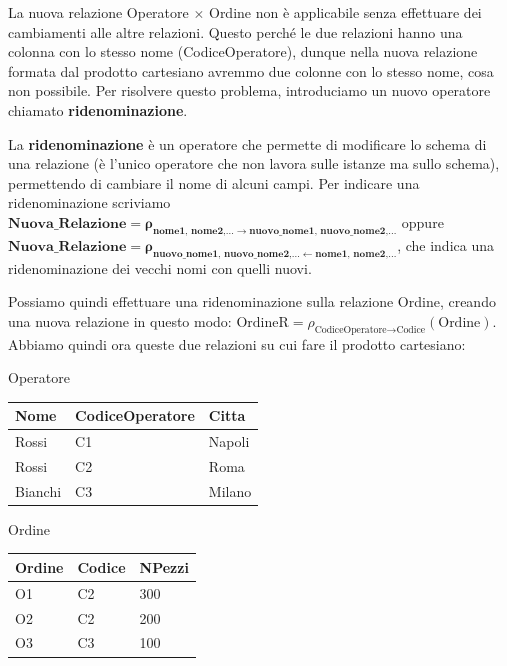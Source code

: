\documentclass[11pt, a4paper, titlepage, oneside]{scrbook}
\begin{document}
La nuova relazione Operatore $\times$ Ordine non è applicabile senza effettuare dei cambiamenti alle altre relazioni. Questo perché le due relazioni hanno una colonna con lo stesso nome (CodiceOperatore), dunque nella nuova relazione formata dal prodotto cartesiano avremmo due colonne con lo stesso nome, cosa non possibile. Per risolvere questo problema, introduciamo un nuovo operatore chiamato \textbf{ridenominazione}.

\begin{Definizione}[Ridenominazione]
\label{def-ridenominazione}
La \textbf{ridenominazione} è un operatore che permette di modificare lo schema di una relazione (è l'unico operatore che non lavora sulle istanze ma sullo schema), permettendo di cambiare il nome di alcuni campi. Per indicare una ridenominazione scriviamo $\textbf{Nuova\_Relazione} \bm{= \rho_{\textbf{nome1, nome2,}\ldots \rightarrow \textbf{nuovo\_nome1, nuovo\_nome2,}\ldots}}$ oppure $\textbf{Nuova\_Relazione} \bm{= \rho_{\textbf{nuovo\_nome1, nuovo\_nome2,}\ldots \leftarrow \textbf{nome1, nome2,}\ldots}}$, che indica una ridenominazione dei vecchi nomi con quelli nuovi.
\end{Definizione}

Possiamo quindi effettuare una ridenominazione sulla relazione Ordine, creando una nuova relazione in questo modo: $\text{OrdineR} = \rho_{\text{CodiceOperatore} \rightarrow  \text{Codice}}(\text{Ordine})$. Abbiamo quindi ora queste due relazioni su cui fare il prodotto cartesiano:


\begin{minipage}[c]{0.45\textwidth}
\begin{center}
    Operatore

\begin{tabular}{|l|l|l|}
\hline
\textbf{Nome} & \textbf{CodiceOperatore} & \textbf{Citta} \\ \hline
Rossi & C1 & Napoli \\
Rossi & C2 & Roma \\
Bianchi & C3 & Milano \\ \hline
\end{tabular}
\end{center}
\end{minipage}\hfill
\begin{minipage}[c]{0.45\textwidth}
\begin{center}
    Ordine

\begin{tabular}{|l|l|l|}
\hline
\textbf{Ordine} & \textbf{Codice} & \textbf{NPezzi} \\ \hline
O1 & C2 & 300 \\
O2 & C2 & 200 \\
O3 & C3 & 100 \\ \hline
\end{tabular}
\end{center}
\end{minipage}
\end{document}

